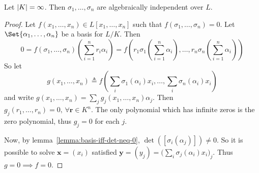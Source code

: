 \begin{lemma} \label{lemma:automorphisms-are-alg-indep}
  Let $\lvert K\rvert = \infty$. Then $\sigma_1, \dots, \sigma_n$ are algebraically independent over $L$.

  \begin{proof}
    Let $f(x_1, \dots, x_n) \in L[x_1, \dots, x_n]$ such that $f(\sigma_1, \dots, \sigma_n) = 0$.
    Let $\Set{\alpha_1, \dots, \alpha_n}$ be a basis for $L/K$. Then
    \[ 0 = f(\sigma_1, \dots, \sigma_n)\left( \sum_{i = 1}^n r_i \alpha_i \right)
      = f \left(r_1 \sigma_1 \left( \sum_{i = 1}^n \alpha_i \right), \dots,
        r_n \sigma_n \left( \sum_{i = 1}^n \alpha_i \right) \right) \]
    So let
    \[ g(x_1, \dots, x_n) \triangleq f \left(\sum_i \sigma_1(\alpha_i) x_i,
      \dots, \sum_i \sigma_n(\alpha_i) x_i \right) \]
  and write $g(x_1, \dots, x_n) = \sum_j g_j(x_1, \dots, x_n) \alpha_j$.
  Then $g_j(r_1, \dots, r_n) = 0, \, \forall \bm{r} \in K^n$. The only
  polynomial which has infinite zeros is the zero polynomial, thus $g_j = 0$ for each $j$.

  Now, by lemma~\ref{lemma:basis-iff-det-neq-0}, $\det([\sigma_i(\alpha_j)]) \neq 0$.
  So it is possible to solve $\bm{x} = (x_i)$ satisfied
  $\bm{y} = (y_j) = \big( \sum_i \sigma_j(\alpha_i) x_i \big)_j$.
  Thus $g = 0 \implies f = 0$.
  \end{proof}
\end{lemma}

